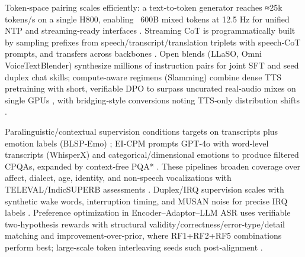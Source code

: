 \documentclass{article}
\begin{document}
Token‑space pairing scales efficiently: a text‑to‑token generator reaches ≈25k tokens/s on a single H800, enabling ~600B mixed tokens at 12.5 Hz for unified NTP and streaming‑ready interfaces \cite{zeng2024scalingspeechtextpretrainingsyntheticint}. Streaming CoT is programmatically built by sampling prefixes from speech/transcript/translation triplets with speech‑CoT prompts, and transfers across backbones \cite{guo2025streamuniachievingstreamingspeechtransla}. Open blends (LLaSO, Omni VoiceTextBlender) synthesize millions of instruction pairs for joint SFT and seed duplex chat skills; compute‑aware regimens (Slamming) combine dense TTS pretraining with short, verifiable DPO to surpass uncurated real‑audio mixes on single GPUs \cite{peng2025voicetextblenderaugmentinglargelanguagem,fang2025llamaomniseamlessspeechinteractionlargel,maimon2025slammingtrainingspeechlanguagemodelonegp}, with bridging‑style conversions noting TTS‑only distribution shifts \cite{wang2023slmbridgethingapbetweenspeechtextfoundat}.

Paralinguistic/contextual supervision conditions targets on transcripts plus emotion labels (BLSP‑Emo) \cite{wang2024blspemotowardsempatheticlargespeechlangu}; EI‑CPM prompts GPT‑4o with word‑level transcripts (WhisperX) and categorical/dimensional emotions to produce filtered CPQAs, expanded by context‑free PQA* \cite{wang2025incorporatingcontextualparalinguisticund}. These pipelines broaden coverage over affect, dialect, age, identity, and non‑speech vocalizations with TELEVAL/IndicSUPERB assessments \cite{chen2025goatslmspokenlanguagemodelparalinguistic,entry2025indicsuperbspeechprocessinguniversalperf,tian2025espnetspeechlmopenspeechlanguagemodeltoo}. Duplex/IRQ supervision scales with synthetic wake words, interruption timing, and MUSAN noise for precise IRQ labels \cite{ma2024languagemodelcanlistenwhilespeaking}. Preference optimization in Encoder–Adaptor–LLM ASR uses verifiable two‑hypothesis rewards with structural validity/correctness/error‑type/detail matching and improvement‑over‑prior, where RF1+RF2+RF5 combinations perform best; large‑scale token interleaving seeds such post‑alignment \cite{li2025seewossubmissionmlcslmlessonslearnedspee,zeng2024scalingspeechtextpretrainingsyntheticint}.
\end{document}
